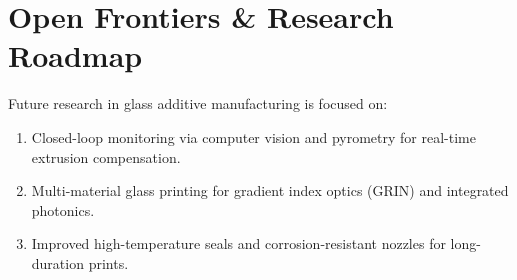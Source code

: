\section{Open Frontiers \& Research Roadmap}
Future research in glass additive manufacturing is focused on:
\begin{enumerate}
    \item Closed-loop monitoring via computer vision and pyrometry for real-time extrusion compensation.
    \item Multi-material glass printing for gradient index optics (GRIN) and integrated photonics.
    \item Improved high-temperature seals and corrosion-resistant nozzles for long-duration prints.
\end{enumerate}
